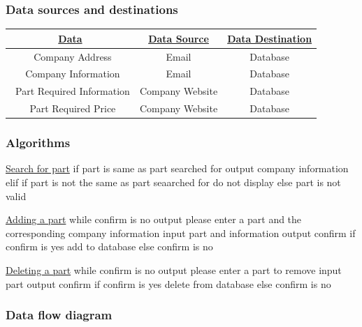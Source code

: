\subsubsection{Data sources and destinations}
\begin{center}
\begin{tabular}{ |c|c|c| } 
\hline
\bf\underline{Data}                                                                                                      & \bf\underline{Data Source} & \bf\underline{Data Destination}

\\
\hline
\ Company Address & Email & Database\\ 
\hline
\ Company Information & Email & Database\\
\hline
\ Part Required Information & Company Website & Database\\
\hline
\ Part Required Price & Company Website & Database\\
\hline
\end{tabular}
\end{center}
\subsubsection{Algorithms}

\underline{Search for part}
if part is same as part searched for
output company information
elif
if part is not the same as part seaarched for
do not display
else
part is not valid

\underline{Adding a part}
while confirm is no
output please enter a part and the corresponding company information
input part and information
output confirm
if confirm is yes
add to database
else 
confirm is no

\underline{Deleting a part}
while confirm is no
output please enter a part to remove
input part
output confirm
if confirm is yes
delete from database
else 
confirm is no

\subsubsection{Data flow diagram}

